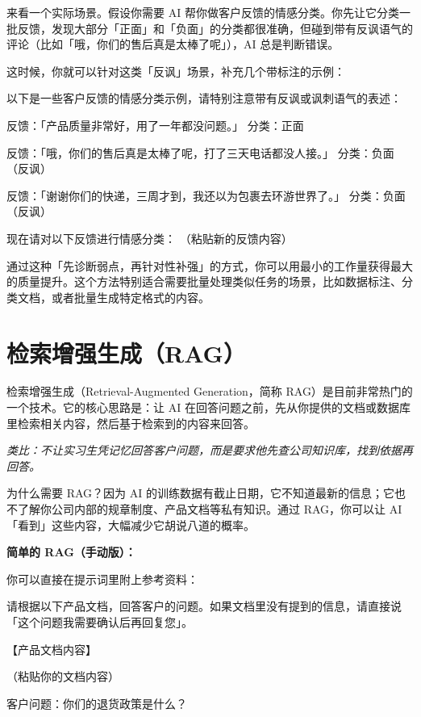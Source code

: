 来看一个实际场景。假设你需要 AI 帮你做客户反馈的情感分类。你先让它分类一批反馈，发现大部分「正面」和「负面」的分类都很准确，但碰到带有反讽语气的评论（比如「哦，你们的售后真是太棒了呢」），AI 总是判断错误。

这时候，你就可以针对这类「反讽」场景，补充几个带标注的示例：

\begin{promptbox}
以下是一些客户反馈的情感分类示例，请特别注意带有反讽或讽刺语气的表述：

反馈：「产品质量非常好，用了一年都没问题。」
分类：正面

反馈：「哦，你们的售后真是太棒了呢，打了三天电话都没人接。」
分类：负面（反讽）

反馈：「谢谢你们的快递，三周才到，我还以为包裹去环游世界了。」
分类：负面（反讽）

现在请对以下反馈进行情感分类：
（粘贴新的反馈内容）
\end{promptbox}

通过这种「先诊断弱点，再针对性补强」的方式，你可以用最小的工作量获得最大的质量提升。这个方法特别适合需要批量处理类似任务的场景，比如数据标注、分类文档，或者批量生成特定格式的内容。

\section{检索增强生成（RAG）}
\label{sec:rag}

检索增强生成（Retrieval-Augmented Generation，简称 RAG）是目前非常热门的一个技术。它的核心思路是：让 AI 在回答问题之前，先从你提供的文档或数据库里检索相关内容，然后基于检索到的内容来回答。

\textit{类比：不让实习生凭记忆回答客户问题，而是要求他先查公司知识库，找到依据再回答。}

为什么需要 RAG？因为 AI 的训练数据有截止日期，它不知道最新的信息；它也不了解你公司内部的规章制度、产品文档等私有知识。通过 RAG，你可以让 AI 「看到」这些内容，大幅减少它胡说八道的概率。

\textbf{简单的 RAG（手动版）：}

你可以直接在提示词里附上参考资料：

\begin{promptbox}
请根据以下产品文档，回答客户的问题。如果文档里没有提到的信息，请直接说「这个问题我需要确认后再回复您」。

【产品文档内容】

（粘贴你的文档内容）

客户问题：你们的退货政策是什么？
\end{promptbox}

